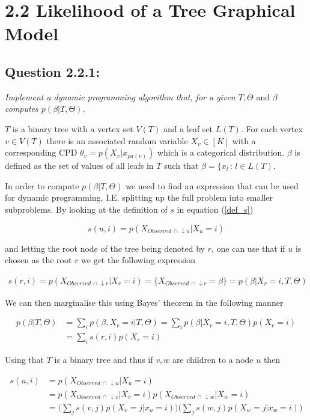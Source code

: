 \section*{2.2 Likelihood of a Tree Graphical Model}

\subsection*{Question 2.2.1:}
\textit{Implement a dynamic programming algorithm that, for a given $T, \Theta \text{ and } \beta$ computes $p(\beta | T, \Theta)$.}

$T$ is a binary tree with a vertex set $V(T)$ and a leaf set $L(T)$. For each vertex $v \in V(T)$ there is an associated random variable $X_v \in [K]$ with a corresponding CPD $\theta_v = p(X_v|x_{pa(v)})$ which is a categorical distribution. $\beta$ is defined as the set of values of all leafs in $T$ such that $\beta = \{x_l \, : \, l \in L(T)$.

In order to compute $p(\beta | T, \Theta)$ we need to find an expression that can be used for dynamic programming, I.E. splitting up the full problem into smaller subproblems. By looking at the definition of $s$ in equation (\ref{def_s})

\begin{equation}
  s(u,i) = p(X_{Observed \, \cap \, \downarrow u}| X_u = i)
  \label{def_s}
\end{equation}

and letting the root node of the tree being denoted by $r$, one can use that if $u$ is chosen as the root $r$ we get the following expression

\begin{align*}
  s(r,i) = p(X_{Observed \, \cap \, \downarrow r}| X_r = i) = \bigg\{ X_{Observed \, \cap \, \downarrow r} = \beta \bigg\} = p(\beta | X_r = i, T, \Theta)
\end{align*}

We can then marginalise this using Bayes' theorem in the following manner

\begin{align}
  p(\beta | T, \Theta) & = \sum_i p(\beta, X_r = i| T, \Theta) = \sum_i p(\beta | X_r = i, T, \Theta)p(X_r = i) \\
  & = \sum_i s(r,i)p(X_r = i)
  \label{sol_eq}
\end{align}

Using that $T$ is a binary tree and thus if $v, w$ are children to a node $u$ then

\begin{align}
  s(u,i) & = p(X_{Observed \, \cap \, \downarrow u}| X_u = i)\nonumber \\
  & = p(X_{Observed \, \cap \, \downarrow v}| X_v = i)
  p(X_{Observed \, \cap \, \downarrow w}| X_w = i) \nonumber\\
  & = \bigg( \sum_j s(v,j)p(X_v = j| x_u = i) \bigg )\bigg( \sum_j s(w,j)p(X_w = j| x_w = i) \bigg )
  \label{traverse_eq}
\end{align}


